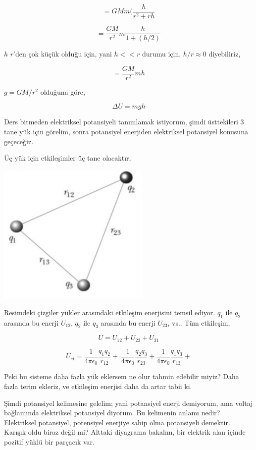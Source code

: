 \documentclass[12pt,fleqn]{article}\usepackage{../../common}
\begin{document}
$$
= GMm ( \frac{h}{r^2 + rh}
$$

$$
= \frac{GM}{r^2}m \frac{h}{1 + (h/2)}
$$

$h$ $r$'den çok küçük olduğu için, yani $h<<r$ durumu için, $h/r \approx 0$
diyebiliriz,

$$
= \frac{GM}{r^2}mh
$$

$g = GM / r^2$ olduğuna göre, 

$$
\Delta U = mgh
$$

Ders bitmeden elektriksel potansiyeli tanımlamak istiyorum, şimdi üsttekileri 3
tane yük için görelim, sonra potansiyel enerjiden elektriksel potansiyel
konusuna geçeceğiz. 

Üç yük için etkileşimler üç tane olacaktır,

\includegraphics[width=20em]{08_07.jpg}

Resimdeki çizgiler yükler arasındaki etkileşim enerjisini temsil ediyor. $q_1$
ile $q_2$ arasında bu enerji $U_{12}$, $q_2$ ile $q_3$ arasında bu enerji
$U_{23}$, vs.. Tüm etkileşim,

$$
U = U_{12} + U_{23} + U_{31}
$$

$$
U_{el} =
\frac{1}{4 \pi \epsilon_0} \frac{q_1 q_2}{r_{12}} + \
\frac{1}{4 \pi \epsilon_0} \frac{q_2 q_3}{r_{23}} + 
\frac{1}{4 \pi \epsilon_0} \frac{q_1 q_3}{r_{13}} + 
$$

Peki bu sisteme daha fazla yük eklersem ne olur tahmin edebilir miyiz? Daha
fazla terim ekleriz, ve etkileşim enerjisi daha da artar tabii ki. 

Şimdi potansiyel kelimesine gelelim; yani potansiyel enerji demiyorum, ama
voltaj bağlamında elektriksel potansiyel diyorum. Bu kelimenin anlamı nedir?
Elektriksel potansiyel, potensiyel enerjiye sahip olma potansiyeli
demektir. Karışık oldu biraz değil mi? Alttaki diyagrama bakalım, bir elektrik
alan içinde pozitif yüklü bir parçacık var.
\end{document}
